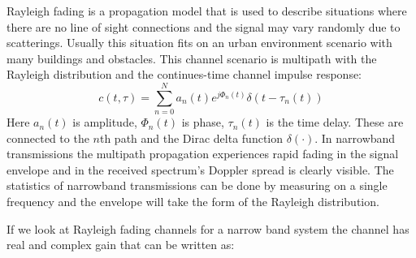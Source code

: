 Rayleigh fading is a propagation model that is used to describe situations where there are no line of sight connections and the signal may vary randomly due to scatterings. Usually this situation fits on an urban environment scenario with many buildings and obstacles. This channel scenario is multipath with the Rayleigh distribution and the continues-time channel impulse response:
\begin{equation}
c(t,\tau) = \sum_{n =0}^{N} a_n(t)e^{j\Phi_n(t)} \delta (t-\tau_n(t))
\end{equation}
Here $a_n(t)$ is amplitude, $\Phi_n(t)$ is phase, $\tau_n(t)$ is the time delay. These are connected to the $n$th path and the Dirac delta function $\delta(\cdot)$.
In narrowband transmissions  the multipath propagation experiences rapid fading in the signal envelope and in the received spectrum's Doppler spread is clearly visible. The statistics of narrowband transmissions can be done by measuring on a  single frequency and the envelope will take the form of the Rayleigh distribution. 

If we look at Rayleigh fading channels for a narrow band system the channel has real and complex gain that can be written as:

